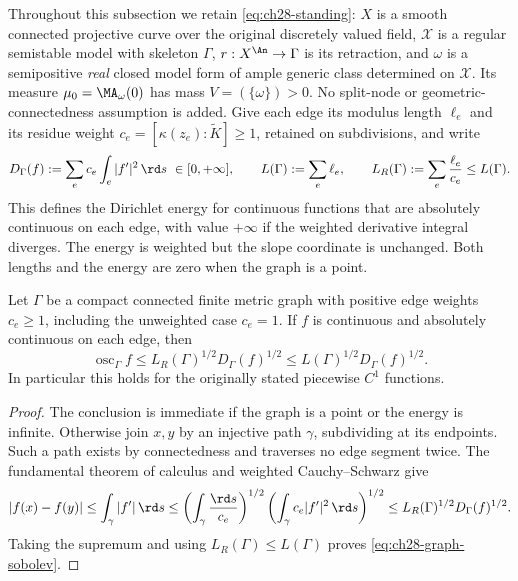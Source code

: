 Throughout this subsection we retain \eqref{eq:ch28-standing}:
\(X\) is a smooth connected projective curve over the original discretely
valued field, \(\mathcal X\) is a regular semistable model with skeleton
\(\Gamma\), \(r:X^{\An}\to\Gamma\) is its retraction, and \(\omega\)
is a semipositive \emph{real} closed model form of ample generic class
determined on \(\mathcal X\).  Its measure \(\mu_0=\MA_\omega(0)\)
has mass \(V=(\{\omega\})>0\).  No split-node or geometric-connectedness
assumption is added.  Give each edge its modulus length \(\ell_e\) and
its residue weight \(c_e=[\kappa(z_e):\widetilde K]\geq1\), retained
on subdivisions, and write
\begin{equation}
\label{eq:ch28-dirichlet-form}
 D_\Gamma(f):=\sum_e c_e\int_e|f'|^2\,\rd s\ \in[0,+\infty],
 \qquad L(\Gamma):=\sum_e\ell_e,
 \qquad L_R(\Gamma):=\sum_e\frac{\ell_e}{c_e}\leq L(\Gamma).
\end{equation}
This defines the Dirichlet energy for continuous functions that are
absolutely continuous on each edge, with value \(+\infty\) if the
weighted derivative integral diverges.  The energy is weighted but the
slope coordinate is unchanged.  Both lengths and the energy are zero
when the graph is a point.

\begin{lemma}
\label{lem:ch28-graph-sobolev}
Let \(\Gamma\) be a compact connected finite metric graph with positive
edge weights \(c_e\geq1\), including the unweighted case \(c_e=1\).
If \(f\) is continuous and absolutely continuous on each edge, then
\begin{equation}
\label{eq:ch28-graph-sobolev}
 \operatorname{osc}_\Gamma f
 \leq L_R(\Gamma)^{1/2}D_\Gamma(f)^{1/2}
 \leq L(\Gamma)^{1/2}D_\Gamma(f)^{1/2}.
\end{equation}
In particular this holds for the originally stated piecewise \(C^1\)
functions.
\end{lemma}

\begin{proof}
The conclusion is immediate if the graph is a point or the energy is
infinite.  Otherwise join \(x,y\) by an injective path \(\gamma\),
subdividing at its endpoints.  Such a path exists by connectedness and
traverses no edge segment twice.  The fundamental theorem of calculus and
weighted Cauchy--Schwarz give
\[
 |f(x)-f(y)|
 \leq\int_\gamma|f'|\,\rd s
 \leq\left(\int_\gamma\frac{\rd s}{c_e}\right)^{1/2}
       \left(\int_\gamma c_e|f'|^2\,\rd s\right)^{1/2}
 \leq L_R(\Gamma)^{1/2}D_\Gamma(f)^{1/2}.
\]
Taking the supremum and using \(L_R(\Gamma)\leq L(\Gamma)\) proves
\eqref{eq:ch28-graph-sobolev}.
\end{proof}

